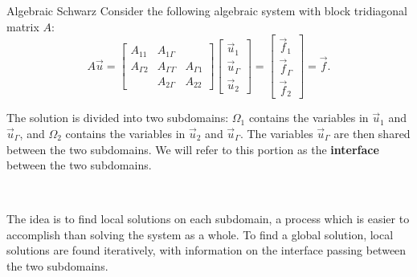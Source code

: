 \documentclass{beamer}
\begin{document}
\begin{frame}{Algebraic Schwarz}
Consider the following algebraic system with block tridiagonal matrix $A$:
\begin{equation*}
	A \vec{u} = \begin{bmatrix} A_{11} & A_{1 \Gamma} \\ A_{\Gamma 2} & A_{\Gamma \Gamma} & A_{\Gamma 1} \\ ~ & A_{2 \Gamma} & A_{22} \end{bmatrix} \begin{bmatrix} \vec{u}_1 \\ \vec{u}_\Gamma \\ \vec{u}_2 \end{bmatrix} = \begin{bmatrix} \vec{f}_1 \\ \vec{f}_\Gamma \\ \vec{f}_2 \end{bmatrix} = \vec{f} .
\end{equation*}

The solution is divided into two subdomains: $\Omega_1$ contains the variables in $\vec{u}_1$ and $\vec{u}_\Gamma$, and $\Omega_2$ contains the variables in $\vec{u}_2$ and $\vec{u}_\Gamma$.
The variables $\vec{u}_\Gamma$ are then shared between the two subdomains.
We will refer to this portion as the \textbf{interface} between the two subdomains.

~

The idea is to find local solutions on each subdomain, a process which is easier to accomplish than solving the system as a whole.
To find a global solution, local solutions are found iteratively, with information on the interface passing between the two subdomains.
\end{frame}
\end{document}

